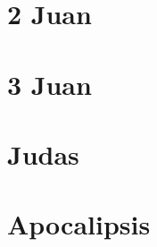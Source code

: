 \chapter{2 Juan}
\begin{multicols}{2}
  \parskip=0pt \relax
  
\end{multicols}

\chapter{3 Juan}
\begin{multicols}{2}
  \parskip=0pt \relax
  
\end{multicols}

\chapter{Judas}
\begin{multicols}{2}
  \parskip=0pt \relax
  
\end{multicols}

\chapter{Apocalipsis}
\begin{multicols}{2}
  \parskip=0pt \relax
  
\end{multicols}
\newpage





















